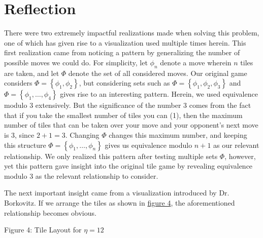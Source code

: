 \documentclass[11pt, letterpaper]{article}
\begin{document}
\section{Reflection}
\label{sec:4}
There were two extremely impactful realizations made when solving this problem, one of which has given rise to a visualization used multiple times herein. This first realization came from noticing a pattern by generalizing the number of possible moves we could do. For simplicity, let $\phi _n$ denote a move wherein $n$ tiles are taken, and let $\Phi $ denote the set of all considered moves. Our original game considers $\Phi =\left\{ \phi _1,\phi _2 \right\} $, but considering sets such as $\Phi =\left\{ \phi _1,\phi _2,\phi _3 \right\} $ and $\Phi =\left\{ \phi _1,\ldots,\phi _4 \right\} $ gives rise to an interesting pattern. Herein, we used equivalence modulo 3 extensively. But the significance of the number 3 comes from the fact that if you take the smallest number of tiles you can (1), then the maximum number of tiles that can be taken over your move and your opponent's next move is 3, since $2+1=3$. Changing $\Phi $ changes this maximum number, and keeping this structure $\Phi =\left\{ \phi _1, \dots, \phi _n  \right\} $ gives us equivalence modulo $n+1$ as our relevant relationship. We only realized this pattern after testing multiple sets $\Phi $, however, yet this pattern gave insight into the original tile game by revealing equivalence modulo 3 as the relevant relationship to consider.

The next important insight came from a visualization introduced by Dr. Borkovitz. If we arrange the tiles as shown in \hyperref[fig:4]{figure 4}, the aforementioned relationship becomes obvious.

\begin{center}
    
    \noindent Figure 4: Tile Layout for $\eta =12$\label{fig:4}
\end{center}
\end{document}
